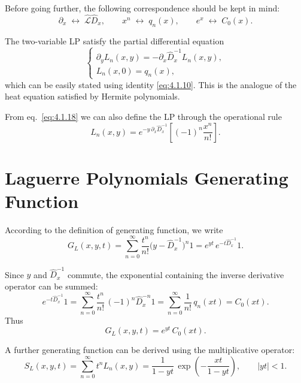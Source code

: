 Before going further, the following correspondence should be kept in mind:
\begin{equation}
\partial_x \;\longleftrightarrow\; \hat{\mathcal L}\!\hat D_x,
\qquad
x^n \;\longleftrightarrow\; q_n(x),
\qquad
e^x \;\longleftrightarrow\; C_0(x).
\label{eq:4.1.17}
\end{equation}

The two-variable LP satisfy the partial differential equation
\begin{equation}
\begin{cases}
\partial_y L_n(x,y) = -\partial_x \hat D_x^{-1} L_n(x,y),\\[2pt]
L_n(x,0) = q_n(x),
\end{cases}
\label{eq:4.1.18}
\end{equation}
which can be easily stated using identity \eqref{eq:4.1.10}. This is the
analogue of the heat equation satisfied by Hermite polynomials.

From eq.~\eqref{eq:4.1.18} we can also define the LP through the
operational rule
\begin{equation}
L_n(x,y) = e^{-y\,\partial_x \hat D_x^{-1}}
\!\left[(-1)^n\frac{x^n}{n!}\right].
\label{eq:4.1.20}
\end{equation}

\section{Laguerre Polynomials Generating Function}

According to the definition of generating function, we write
\begin{equation}
G_L(x,y,t) = \sum_{n=0}^{\infty} \frac{t^n}{n!}
\bigl(y-\hat D_x^{-1}\bigr)^n 1
= e^{y t}\,e^{-t \hat D_x^{-1}} 1.
\label{eq:4.2.1}
\end{equation}

Since $y$ and $\hat D_x^{-1}$ commute, the exponential containing the
inverse derivative operator can be summed:
\begin{equation}
e^{-t \hat D_x^{-1}} 1
= \sum_{n=0}^{\infty} \frac{t^n}{n!}\,(-1)^n \hat D_x^{-n} 1
= \sum_{n=0}^{\infty} \frac{1}{n!}\,q_n(xt)
= C_0(xt).
\label{eq:4.2.2}
\end{equation}
Thus
\begin{equation}
G_L(x,y,t) = e^{yt}\,C_0(xt).
\label{eq:4.2.3}
\end{equation}

A further generating function can be derived using the multiplicative
operator:
\begin{equation}
S_L(x,y,t) = \sum_{n=0}^{\infty} t^n L_n(x,y)
= \frac{1}{1-yt}\,\exp\!\left(-\frac{xt}{1-yt}\right),
\qquad |yt|<1.
\label{eq:4.2.4}
\end{equation}

